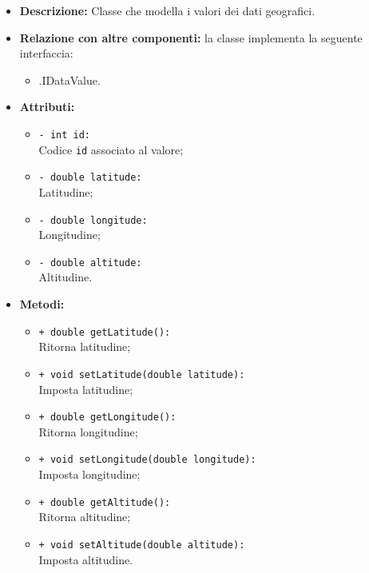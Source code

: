\begin{flushleft}
\begin{itemize}
\item \textbf{Descrizione:} Classe che modella i valori dei dati geografici.
\item \textbf{Relazione con altre componenti:} la classe implementa la seguente interfaccia:
		\begin{itemize}
			\item \smodel{}.IDataValue.
		\end{itemize}
\item \textbf{Attributi:}
\begin{sloppypar}
\begin{itemize}
\item \texttt{- int id:}\\ Codice \texttt{id} associato al valore;
\item \texttt{- double latitude:}\\ Latitudine;
\item \texttt{- double longitude:}\\ Longitudine;
\item \texttt{- double altitude:}\\ Altitudine.
\end{itemize}
\end{sloppypar}
\item \textbf{Metodi:}
\begin{sloppypar}
\begin{itemize}
\item \texttt{+ double getLatitude():}\\ Ritorna latitudine;
\item \texttt{+ void setLatitude(double latitude):}\\ Imposta latitudine;
\item \texttt{+ double getLongitude():}\\ Ritorna longitudine;
\item \texttt{+ void setLongitude(double longitude):}\\ Imposta longitudine;
\item \texttt{+ double getAltitude():}\\ Ritorna altitudine;
\item \texttt{+ void setAltitude(double altitude):}\\ Imposta altitudine.
\end{itemize}
\end{sloppypar}
\end{itemize}
\end{flushleft}

